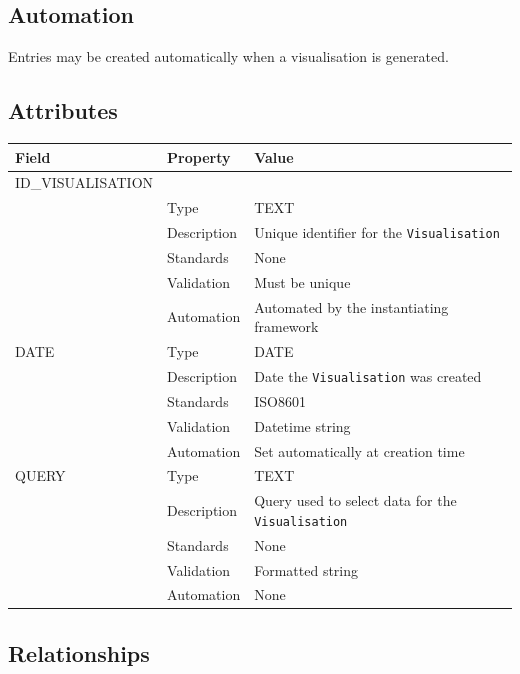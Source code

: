 \documentclass[
]{article}
\newcounter{none} %
\begin{document}
\subsection{Automation}\label{automation-41}

Entries may be created automatically when a visualisation is generated.

\subsection{Attributes}\label{attributes-35}

{\def\LTcaptype{none} %
\begin{longtable}[]{@{}lll@{}}
\toprule\noalign{}
Field & Property & Value \\
\midrule\noalign{}
\endhead
\bottomrule\noalign{}
\endlastfoot
ID\_VISUALISATION & & \\
& Type & TEXT \\
& Description & Unique identifier for the \texttt{Visualisation} \\
& Standards & None \\
& Validation & Must be unique \\
& Automation & Automated by the instantiating framework \\
DATE & Type & DATE \\
& Description & Date the \texttt{Visualisation} was created \\
& Standards & ISO8601 \\
& Validation & Datetime string \\
& Automation & Set automatically at creation time \\
QUERY & Type & TEXT \\
& Description & Query used to select data for the
\texttt{Visualisation} \\
& Standards & None \\
& Validation & Formatted string \\
& Automation & None \\
\end{longtable}
}

\subsection{Relationships}\label{relationships-33}
\end{document}
